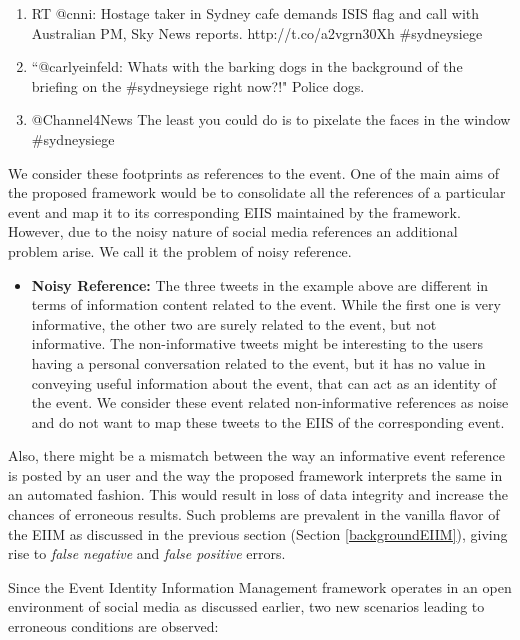 \begin{enumerate}
\item RT @cnni: Hostage taker in Sydney cafe demands ISIS flag and call with Australian PM, Sky News reports. http://t.co/a2vgrn30Xh \#sydneysiege
\item ``@carlyeinfeld: Whats with the barking dogs in the background of the briefing on the \#sydneysiege right now?!" Police dogs.
\item @Channel4News The least you could do is to pixelate the faces in the window \#sydneysiege
\end{enumerate}

We consider these footprints as references to the event. One of the main aims of the proposed framework would be to consolidate all the references of a particular event and map it to its corresponding EIIS maintained by the framework. However, due to the noisy nature of social media references an additional problem arise. We call it the problem of noisy reference.

\begin{itemize}
\item \textbf{Noisy Reference:} The three tweets in the example above are different in terms of information content related to the event. While the first one is very informative, the other two are surely related to the event, but not informative. The non-informative tweets might be interesting to the users having a personal conversation related to the event, but it has no value in conveying useful information about the event, that can act as an identity of the event. We consider these event related non-informative references as noise and do not want to map these tweets to the EIIS of the corresponding event. 
\end{itemize}

Also, there might be a mismatch between the way an informative event reference is posted by an user and the way the proposed framework interprets the same in an automated fashion. This would result in loss of data integrity and increase the chances of erroneous results. Such problems are prevalent in the vanilla flavor of the EIIM as discussed in the previous section (Section \ref{backgroundEIIM}), giving rise to \textit{false negative} and \textit{false positive} errors. 


Since the Event Identity Information Management framework operates in an open environment of social media as discussed earlier, two new scenarios leading to erroneous conditions are observed:

